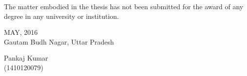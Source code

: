 \documentclass[12pt, oneside]{Thesis} %
\begin{document}
The matter embodied in the thesis has not been submitted for the award of any degree in any university or institution.\\
\singlespacing
\singlespacing
\singlespacing
\singlespacing
\singlespacing
\singlespacing
\begin{minipage}{.45\linewidth}
\begin{flushleft}                       
MAY, 2016 \\
Gautam Budh Nagar, Uttar Pradesh \\
\end{flushleft} 
\end{minipage}
\hfill
\begin{minipage}{.45\linewidth}
\begin{flushright}                                      

Pankaj Kumar\\
(1410120079)\\
\end{flushright} 
\end{minipage}
\clearpage %

\pagestyle{fancy} %
%

\clearpage %

\pagestyle{fancy} %
%

\clearpage %

\pagestyle{fancy} %


\clearpage %

\end{document}
